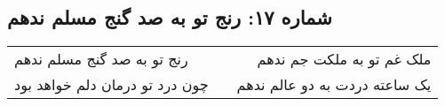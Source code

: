 \begin{center}
\section*{شماره ۱۷: رنج تو به صد گنج مسلم ندهم}
\label{sec:017}
\begin{longtable}{l p{0.5cm} r}
رنج تو به صد گنج مسلم ندهم
&&
ملک غم تو به ملکت جم ندهم
\\
چون درد تو درمان دلم خواهد بود
&&
یک ساعته دردت به دو عالم ندهم
\\
\end{longtable}
\end{center}
